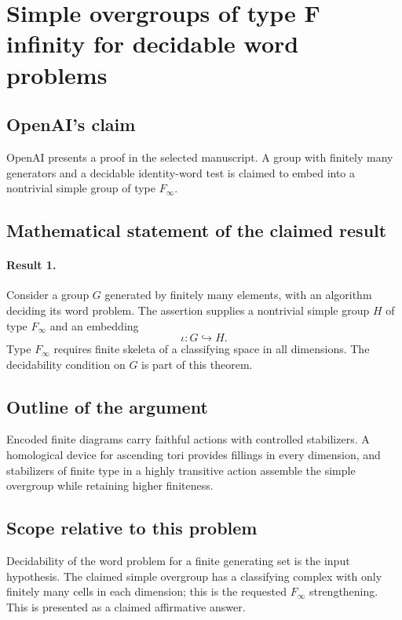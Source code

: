 \documentclass[11pt]{article}
\begin{document}
\section*{Simple overgroups of type F infinity for decidable word problems}

\subsection{OpenAI's claim}
OpenAI presents a proof in the selected manuscript. A group with finitely many generators and a decidable identity-word test is claimed to embed into a nontrivial simple group of type $F_\infty$.

\subsection{Mathematical statement of the claimed result}
\paragraph{Result 1.} Consider a group \(G\) generated by finitely many elements, with an algorithm deciding its word problem. The assertion supplies a nontrivial simple group \(H\) of type \(F_\infty\) and an embedding
\[
 \iota:G\hookrightarrow H.
\]
Type \(F_\infty\) requires finite skeleta of a classifying space in all dimensions. The decidability condition on \(G\) is part of this theorem.

\subsection{Outline of the argument}
Encoded finite diagrams carry faithful actions with controlled stabilizers. A homological device for ascending tori provides fillings in every dimension, and stabilizers of finite type in a highly transitive action assemble the simple overgroup while retaining higher finiteness.

\subsection{Scope relative to this problem}
Decidability of the word problem for a finite generating set is the input hypothesis. The claimed simple overgroup has a classifying complex with only finitely many cells in each dimension; this is the requested $F_\infty$ strengthening. This is presented as a claimed affirmative answer.
\end{document}
